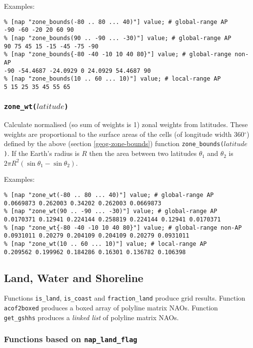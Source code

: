  Examples:
  \begin{verbatim}
% [nap "zone_bounds(-80 .. 80 ... 40)"] value; # global-range AP
-90 -60 -20 20 60 90
% [nap "zone_bounds(90 .. -90 ... -30)"] value; # global-range AP
90 75 45 15 -15 -45 -75 -90
% [nap "zone_bounds{-80 -40 -10 10 40 80}"] value; # global-range non-AP
-90 -54.4687 -24.0929 0 24.0929 54.4687 90
% [nap "zone_bounds(10 .. 60 ... 10)"] value; # local-range AP
5 15 25 35 45 55 65
\end{verbatim}

\subsubsection{\texttt{zone\_wt(}$latitude$\texttt{)}}
    \label{geog-zone-wt}

Calculate normalised (so sum of weights is 1) zonal weights from latitudes.
These weights are proportional to the surface areas of the
  cells (of longitude width 360$^{\circ}$) defined by the above 
(section  \ref{geog-zone-bounds})
function 
\texttt{zone\_bounds(}$latitude$\texttt{)}.
If the Earth's radius is 
  $R$ then the area between two latitudes 
  $\theta_1$ and 
  $\theta_2$ is 
  $2\pi R^2(\sin{\theta_1} - \sin{\theta_2})$.
  
 Examples:
  \begin{verbatim}
% [nap "zone_wt(-80 .. 80 ... 40)"] value; # global-range AP
0.0669873 0.262003 0.34202 0.262003 0.0669873
% [nap "zone_wt(90 .. -90 ... -30)"] value; # global-range AP
0.0170371 0.12941 0.224144 0.258819 0.224144 0.12941 0.0170371
% [nap "zone_wt{-80 -40 -10 10 40 80}"] value; # global-range non-AP
0.0931011 0.20279 0.204109 0.204109 0.20279 0.0931011
% [nap "zone_wt(10 .. 60 ... 10)"] value; # local-range AP
0.209562 0.199962 0.184286 0.16301 0.136782 0.106398
\end{verbatim}

\subsection{Land, Water and Shoreline}
    \label{geog-land}

Functions \texttt{is\_land}, \texttt{is\_coast} and \texttt{fraction\_land} produce grid results.
Function \texttt{acof2boxed} produces a boxed array of polyline matrix NAOs.
Function \texttt{get\_gshhs} produces a {\em linked list} of polyline matrix NAOs.

\subsubsection{Functions based on \texttt{nap\_land\_flag}}
\label{land-flag-functions}

